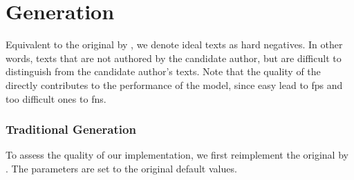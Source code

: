 \section{\imp{} Generation}
\label{sec:impostor_generation}

Equivalent to the original \impAppr{} by \citet{koppel_determining_2014}, we denote ideal \imp{} texts as hard negatives.
In other words, texts that are not authored by the candidate author, but are difficult to distinguish from the candidate author's texts.
Note that the quality of the \imps{} directly contributes to the performance of the model, 
since easy \imps{} lead to \acp{fp} and too difficult ones to \acp{fn}.

\subsubsection{Traditional \imp{} Generation}
\label{subsubsec:traditional_impostor_generation}

To assess the quality of our \impAppr{} implementation, we first reimplement the original \impAppr{} by \citet{koppel_determining_2014}.
The parameters are set to the original default values.


